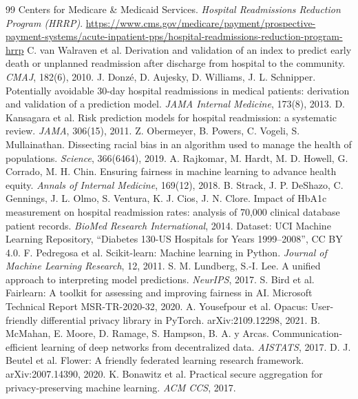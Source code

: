 \documentclass[10pt,a4paper]{article}
\begin{document}
\begin{thebibliography}{99}
\setlength{\itemsep}{1pt}
 Centers for Medicare \& Medicaid Services. \emph{Hospital Readmissions Reduction Program (HRRP)}. \url{https://www.cms.gov/medicare/payment/prospective-payment-systems/acute-inpatient-pps/hospital-readmissions-reduction-program-hrrp}
 C. van Walraven et al. Derivation and validation of an index to predict early death or unplanned readmission after discharge from hospital to the community. \emph{CMAJ}, 182(6), 2010.
 J. Donzé, D. Aujesky, D. Williams, J. L. Schnipper. Potentially avoidable 30-day hospital readmissions in medical patients: derivation and validation of a prediction model. \emph{JAMA Internal Medicine}, 173(8), 2013.
 D. Kansagara et al. Risk prediction models for hospital readmission: a systematic review. \emph{JAMA}, 306(15), 2011.
 Z. Obermeyer, B. Powers, C. Vogeli, S. Mullainathan. Dissecting racial bias in an algorithm used to manage the health of populations. \emph{Science}, 366(6464), 2019.
 A. Rajkomar, M. Hardt, M. D. Howell, G. Corrado, M. H. Chin. Ensuring fairness in machine learning to advance health equity. \emph{Annals of Internal Medicine}, 169(12), 2018.
 B. Strack, J. P. DeShazo, C. Gennings, J. L. Olmo, S. Ventura, K. J. Cios, J. N. Clore. Impact of HbA1c measurement on hospital readmission rates: analysis of 70,000 clinical database patient records. \emph{BioMed Research International}, 2014. Dataset: UCI Machine Learning Repository, “Diabetes 130-US Hospitals for Years 1999–2008”, CC BY 4.0.
 F. Pedregosa et al. Scikit-learn: Machine learning in Python. \emph{Journal of Machine Learning Research}, 12, 2011.
 S. M. Lundberg, S.-I. Lee. A unified approach to interpreting model predictions. \emph{NeurIPS}, 2017.
 S. Bird et al. Fairlearn: A toolkit for assessing and improving fairness in AI. Microsoft Technical Report MSR-TR-2020-32, 2020.
 A. Yousefpour et al. Opacus: User-friendly differential privacy library in PyTorch. arXiv:2109.12298, 2021.
 B. McMahan, E. Moore, D. Ramage, S. Hampson, B. A. y Arcas. Communication-efficient learning of deep networks from decentralized data. \emph{AISTATS}, 2017.
 D. J. Beutel et al. Flower: A friendly federated learning research framework. arXiv:2007.14390, 2020.
 K. Bonawitz et al. Practical secure aggregation for privacy-preserving machine learning. \emph{ACM CCS}, 2017.

\end{thebibliography}
\end{document}
